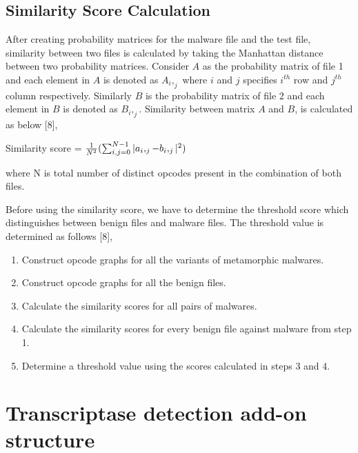 \subsection{Similarity Score Calculation}
After creating probability matrices for the malware file and the test file, similarity between two files is calculated by taking the Manhattan distance between two probability matrices. Consider $A$ as the probability matrix of file 1 and each element in $A$ is denoted as $A_i,_j$ where $i$ and $j$ specifies $i^{th}$ row and $j^{th}$ column respectively. Similarly $B$ is the probability matrix of file 2 and each element in $B$ is denoted as $B_i,_j$. Similarity between matrix $A$ and $B$, is calculated as below [8],

Similarity score = ${1 \over N^2}(\sum_{i,j=0}^{N-1}|a_i,_j-b_i,_j|^2)$ 

where N is total number of distinct opcodes present in the combination of both files.

Before using the similarity score, we have to determine the threshold score which distinguishes between benign files and malware files. The threshold value is determined as follows [8],
\begin{enumerate}
\item Construct opcode graphs for all the variants of metamorphic malwares.
\item Construct opcode graphs for all the benign files.
\item Calculate the similarity scores for all pairs of malwares.
\item Calculate the similarity scores for every benign file against malware from step 1.
\item Determine a threshold value using the scores calculated in steps 3 and 4.
\end{enumerate}

\section{Transcriptase detection add-on structure}

